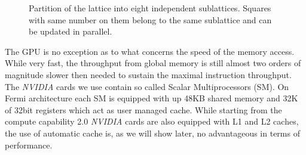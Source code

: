 \documentclass[a4paper]{llncs}
\def\bksize{8}
\begin{document}
\begin{figure}
\begin{center}
\end{center}
\caption{\label{fig:part}Partition of the lattice into eight
  independent sublattices. Squares with same number on them belong to
  the same sublattice and can be updated in parallel.}
\end{figure}

The GPU is no exception as to what concerns the speed of the memory access.
While very fast, the throughput from global memory is still almost two orders
of magnitude slower then needed to sustain the maximal instruction throughput.
The \emph{NVIDIA} cards we use contain so called { Scalar Multiprocessors}
(SM). On Fermi architecture each SM is equipped with up 48KB shared memory and
32K of 32bit registers\cite{Fermi} which act as user managed cache. While
starting from the compute capability 2.0 \emph{NVIDIA} cards are also equipped
with L1 and L2 caches, the use of automatic cache is, as we will show later, no
advantageous in terms of performance.
\end{document}
